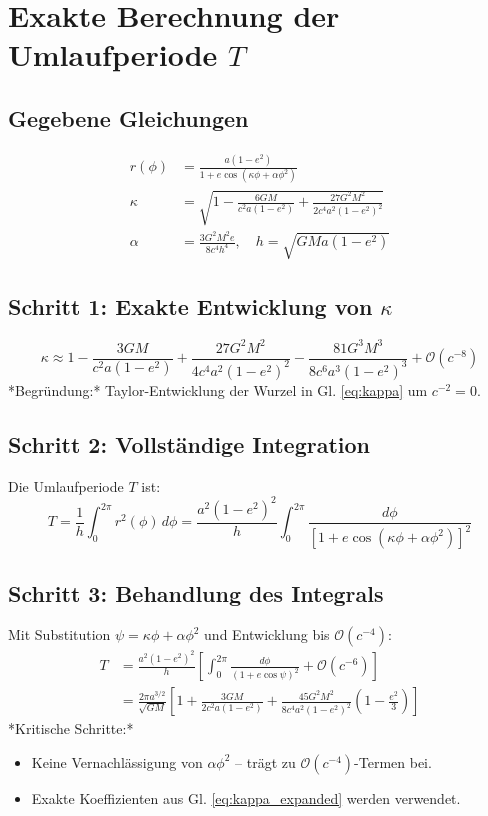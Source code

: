 \newpage
\section{Exakte Berechnung der Umlaufperiode \( T \)}

\subsection*{Gegebene Gleichungen}
\begin{align}
r(\phi) &= \frac{a(1-e^2)}{1 + e\cos\left(\kappa\phi + \alpha\phi^2\right)} \label{eq:orbit} \\
\kappa &= \sqrt{1 - \frac{6GM}{c^2a(1-e^2)} + \frac{27G^2M^2}{2c^4a^2(1-e^2)^2}} \label{eq:kappa} \\
\alpha &= \frac{3G^2M^2e}{8c^4h^4}, \quad h = \sqrt{GMa(1-e^2)} \label{eq:alpha}
\end{align}

\subsection*{Schritt 1: Exakte Entwicklung von \(\kappa\)}
\begin{equation}
\kappa \approx 1 - \frac{3GM}{c^2a(1-e^2)} + \frac{27G^2M^2}{4c^4a^2(1-e^2)^2} - \frac{81G^3M^3}{8c^6a^3(1-e^2)^3} + \mathcal{O}(c^{-8}) \label{eq:kappa_expanded}
\end{equation}
*Begründung:* Taylor-Entwicklung der Wurzel in Gl. \eqref{eq:kappa} um \(c^{-2} = 0\).

\subsection*{Schritt 2: Vollständige Integration}
Die Umlaufperiode \( T \) ist:
\begin{equation}
T = \frac{1}{h} \int_0^{2\pi} r^2(\phi) \, d\phi = \frac{a^2(1-e^2)^2}{h} \int_0^{2\pi} \frac{d\phi}{\left[1 + e\cos\left(\kappa\phi + \alpha\phi^2\right)\right]^2} \label{eq:T_integral}
\end{equation}

\subsection*{Schritt 3: Behandlung des Integrals}
Mit Substitution \(\psi = \kappa\phi + \alpha\phi^2\) und Entwicklung bis \(\mathcal{O}(c^{-4})\):
\begin{align}
T &= \frac{a^2(1-e^2)^2}{h} \left[ \int_0^{2\pi} \frac{d\phi}{(1 + e\cos\psi)^2} + \mathcal{O}(c^{-6}) \right] \\
  &= \frac{2\pi a^{3/2}}{\sqrt{GM}} \left[1 + \frac{3GM}{2c^2a(1-e^2)} + \frac{45G^2M^2}{8c^4a^2(1-e^2)^2}\left(1 - \frac{e^2}{3}\right)\right] \label{eq:T_final}
\end{align}
*Kritische Schritte:*
\begin{itemize}
\item Keine Vernachlässigung von \(\alpha\phi^2\) – trägt zu \(\mathcal{O}(c^{-4})\)-Termen bei.
\item Exakte Koeffizienten aus Gl. \eqref{eq:kappa_expanded} werden verwendet.
\end{itemize}

